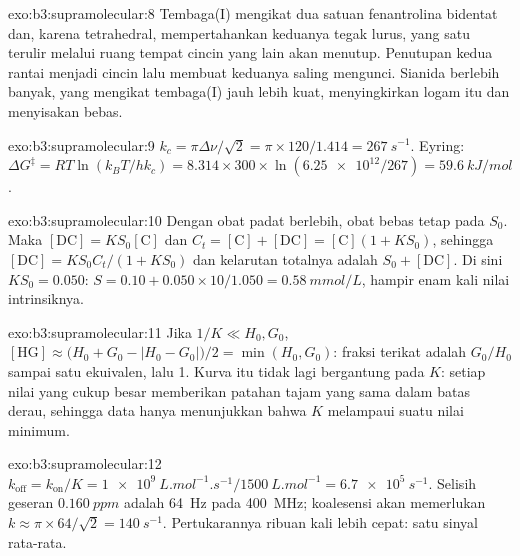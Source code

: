 \begin{solution}{exo:b3:supramolecular:8}
Tembaga(I) mengikat dua satuan fenantrolina bidentat dan, karena tetrahedral, mempertahankan
keduanya tegak lurus, yang satu terulir melalui ruang tempat cincin yang lain akan
menutup. Penutupan kedua rantai menjadi cincin lalu membuat keduanya saling mengunci. Sianida
berlebih banyak, yang mengikat tembaga(I) jauh lebih kuat, menyingkirkan logam itu dan menyisakan
 bebas.
\end{solution}

\begin{solution}{exo:b3:supramolecular:9}
$k_c = \pi\Delta\nu/\sqrt2 = \pi \times 120/1.414 = \qty{267}{s^{-1}}$. Eyring:
$\Delta G^\ddagger = RT\ln(k_BT/hk_c) = 8.314 \times 300 \times \ln(\num{6.25e12}/267) = \qty{59.6}{kJ/mol}$.
\end{solution}

\begin{solution}{exo:b3:supramolecular:10}
Dengan obat padat berlebih, obat bebas tetap pada $S_0$. Maka $[\mathrm{DC}] = KS_0[\mathrm C]$ dan
$C_t = [\mathrm C] + [\mathrm{DC}] = [\mathrm C](1 + KS_0)$, sehingga $[\mathrm{DC}] = KS_0C_t/(1 + KS_0)$ dan kelarutan totalnya adalah $S_0 + [\mathrm{DC}]$. Di sini
$KS_0 = 0.050$: $S = 0.10 + 0.050 \times 10/1.050 = \qty{0.58}{mmol/L}$, hampir enam kali nilai intrinsiknya.
\end{solution}

\begin{solution}{exo:b3:supramolecular:11}
Jika $1/K \ll H_0, G_0$, $[\mathrm{HG}] \approx \bigl(H_0 + G_0 - |H_0 - G_0|\bigr)/2 = \min(H_0, G_0)$: fraksi terikat adalah $G_0/H_0$ sampai satu
ekuivalen, lalu 1. Kurva itu tidak lagi bergantung pada $K$: setiap nilai yang cukup besar
memberikan patahan tajam yang sama dalam batas derau, sehingga data hanya menunjukkan bahwa $K$ melampaui
suatu nilai minimum.
\end{solution}

\begin{solution}{exo:b3:supramolecular:12}
$k_{\mathrm{off}} = k_{\mathrm{on}}/K = \qty{1e9}{L.mol^{-1}.s^{-1}}/\qty{1500}{L.mol^{-1}} = \qty{6.7e5}{s^{-1}}$. Selisih geseran
$\qty{0.160}{ppm}$ adalah \qty{64}{Hz} pada \qty{400}{MHz}; koalesensi akan memerlukan $k \approx \pi \times 64/\sqrt2 = \qty{140}{s^{-1}}$. Pertukarannya
ribuan kali lebih cepat: satu sinyal rata-rata.
\end{solution}

